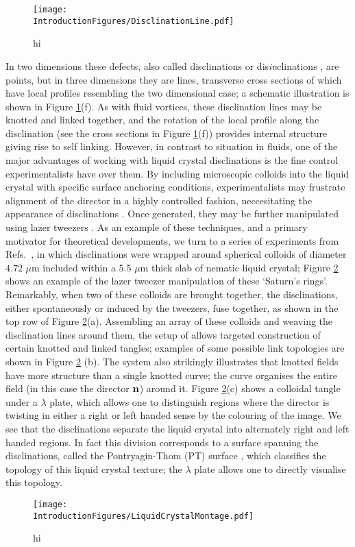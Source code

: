 \begin{figure}[htbp]
\centering
\texttt{[image: \\IntroductionFigures/DisclinationLine.pdf]}
\caption{hi }
\label{fig:Disclination}
\end{figure}

In two dimensions these defects, also called disclinations or dis\emph{in}clinations \cite{Frank}, are points, but in three dimensions they are lines, transverse cross sections of which have local profiles resembling the two dimensional case; a schematic illustration is shown in Figure \ref{fig:Disclination}(f). As with fluid vortices, these disclination lines may be knotted and linked together, and the rotation of the local profile along the disclination (see the cross sections in Figure \ref{fig:Disclination}(f)) provides internal structure giving rise to self linking. However, in contrast to situation in fluids, one of the major advantages of working with liquid crystal disclinations is the fine control experimentalists have over them. By including microscopic colloids into the liquid crystal with specific surface anchoring conditions, experimentalists may frustrate alignment of the director in a highly controlled fashion, neccesitating the appearance of disclinations \cite{}. Once generated, they may be further manipulated using lazer tweezers \citep{Tkalec2011}. As an example of these techniques, and a primary motivator for theoretical developments, we turn to a series of experiments from Refs.~\citep{Tkalec2011,Tasinkevych2014,Copar2015}, in which disclinations were wrapped around spherical colloids of diameter $4.72$ $\mu$m included within a 5.5 $\mu$m thick slab of nematic liquid crystal; Figure \ref{fig:KnottedLiquidCrystal} shows an example of the lazer tweezer manipulation of these `Saturn's rings'. Remarkably, when two of these colloids are brought together, the disclinations, either spontaneously or induced by the tweezers, fuse together, as shown in the top row of Figure \ref{fig:KnottedLiquidCrystal}(a). Assembling an array of these colloids and weaving the disclination lines around them, the setup of \citep{Tkalec2011,Tasinkevych2014,Copar2015} allows targeted construction of certain knotted and linked tangles; examples of some possible link topologies are shown in Figure \ref{fig:KnottedLiquidCrystal} (b). The system also strikingly illustrates that knotted fields have more structure than a single knotted curve; the curve organises the entire field (in this case the director $\bf n$) around it. Figure \ref{fig:KnottedLiquidCrystal}(c) shows a colloidal tangle under a $\lambda$ plate, which allows one to distinguish regions where the director is twisting in either a right or left handed sense by the colouring of the image. We see that the disclinations separate the liquid crystal into alternately right and left handed regions. In fact this division corresponds to a surface spanning the disclinations, called the Pontryagin-Thom (PT) surface \cite{Chen}, which classifies the topology of this liquid crystal texture; the $\lambda$ plate allows one to directly visualise this topology.
\begin{figure}[htbp]
\centering
\texttt{[image: \\IntroductionFigures/LiquidCrystalMontage.pdf]}
\caption{hi }
\label{fig:KnottedLiquidCrystal}
\end{figure}
